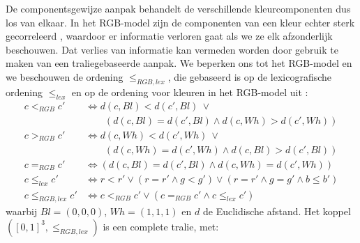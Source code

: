 De componentsgewijze aanpak behandelt de verschillende kleurcomponenten dus los van
elkaar. In het RGB-model zijn de componenten van een kleur echter sterk gecorreleerd 
\cite{sharma:digital_color_imaging}, waardoor er
informatie verloren gaat als we ze elk afzonderlijk beschouwen. Dat verlies van informatie kan vermeden
worden door gebruik te maken van een traliegebaseerde aanpak.
We beperken ons tot het RGB-model en we beschouwen de ordening $\leq_{RGB,lex}$, die
gebaseerd is op de lexicografische ordening $\leq_{lex}$ en op de ordening voor kleuren in het 
RGB-model uit \cite{dewitte:vect_morph_ops}:
\begin{align*}
c <_{RGB} c' & \iff d(c,Bl) < d(c',Bl)\ \lor \\
			 & \qquad (d(c,Bl) = d(c',Bl) \land d(c,Wh) > d(c',Wh)) \\
c >_{RGB} c' & \iff d(c,Wh) < d(c',Wh)\ \lor \\
			 & \qquad(d(c,Wh) = d(c',Wh) \land d(c,Bl) > d(c',Bl)) \\
c =_{RGB} c' & \iff (d(c,Bl) = d(c',Bl) \land d(c,Wh) = d(c',Wh)) \\
c \leq_{lex} c' & \iff r < r' \lor (r = r' \land g < g') \lor (r = r' \land g = g' \land b \leq b') \\
c \leq_{RGB,lex} c' & \iff c <_{RGB} c' \lor (c =_{RGB} c' \land c \leq_{lex} c')
\end{align*}
waarbij $Bl = (0,0,0)$, $Wh = (1,1,1)$ en $d$ de Euclidische afstand.
Het koppel $([0,1]^3,\leq_{RGB,lex})$ is een complete tralie, met:
